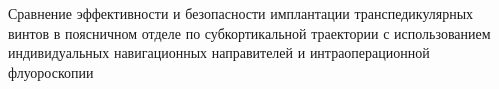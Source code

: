 
Сравнение эффективности и безопасности имплантации транспедикулярных
винтов в поясничном отделе по субкортикальной траектории с использованием
индивидуальных навигационных направителей и интраоперационной
флуороскопии
